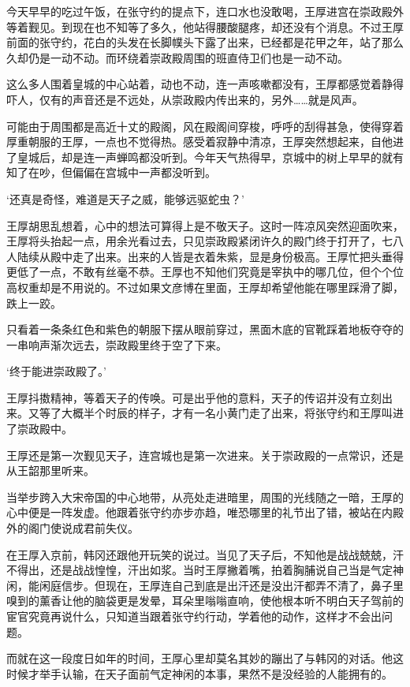 今天早早的吃过午饭，在张守约的提点下，连口水也没敢喝，王厚进宫在崇政殿外等着觐见。到现在也不知等了多久，他站得腰酸腿疼，却还没有个消息。不过王厚前面的张守约，花白的头发在长脚幞头下露了出来，已经都是花甲之年，站了那么久却仍是一动不动。而环绕着崇政殿周围的班直侍卫们也是一动不动。

这么多人围着皇城的中心站着，动也不动，连一声咳嗽都没有，王厚都感觉着静得吓人，仅有的声音还是不远处，从崇政殿内传出来的，另外……就是风声。

可能由于周围都是高近十丈的殿阁，风在殿阁间穿梭，呼呼的刮得甚急，使得穿着厚重朝服的王厚，一点也不觉得热。感受着寂静中清凉，王厚突然想起来，自他进了皇城后，却是连一声蝉鸣都没听到。今年天气热得早，京城中的树上早早的就有知了在吵，但偏偏在宫城中一声都没听到。

‘还真是奇怪，难道是天子之威，能够远驱蛇虫？’

王厚胡思乱想着，心中的想法可算得上是不敬天子。这时一阵凉风突然迎面吹来，王厚将头抬起一点，用余光看过去，只见崇政殿紧闭许久的殿门终于打开了，七八人陆续从殿中走了出来。出来的人皆是衣着朱紫，显是身份极高。王厚忙把头垂得更低了一点，不敢有丝毫不恭。王厚也不知他们究竟是宰执中的哪几位，但个个位高权重却是不用说的。不过如果文彦博在里面，王厚却希望他能在哪里踩滑了脚，跌上一跤。

只看着一条条红色和紫色的朝服下摆从眼前穿过，黑面木底的官靴踩着地板夺夺的一串响声渐次远去，崇政殿里终于空了下来。

‘终于能进崇政殿了。’

王厚抖擞精神，等着天子的传唤。可是出乎他的意料，天子的传诏并没有立刻出来。又等了大概半个时辰的样子，才有一名小黄门走了出来，将张守约和王厚叫进了崇政殿中。

王厚还是第一次觐见天子，连宫城也是第一次进来。关于崇政殿的一点常识，还是从王韶那里听来。

当举步跨入大宋帝国的中心地带，从亮处走进暗里，周围的光线随之一暗，王厚的心中便是一阵发虚。他跟着张守约亦步亦趋，唯恐哪里的礼节出了错，被站在内殿外的阁门使说成君前失仪。

在王厚入京前，韩冈还跟他开玩笑的说过。当见了天子后，不知他是战战兢兢，汗不得出，还是战战惶惶，汗出如浆。当时王厚撇着嘴，拍着胸脯说自己当是气定神闲，能闲庭信步。但现在，王厚连自己到底是出汗还是没出汗都弄不清了，鼻子里嗅到的薰香让他的脑袋更是发晕，耳朵里嗡嗡直响，使他根本听不明白天子驾前的宦官究竟再说什么，只知道当跟着张守约行动，学着他的动作，这样才不会出问题。

而就在这一段度日如年的时间，王厚心里却莫名其妙的蹦出了与韩冈的对话。他这时候才举手认输，在天子面前气定神闲的本事，果然不是没经验的人能拥有的。


